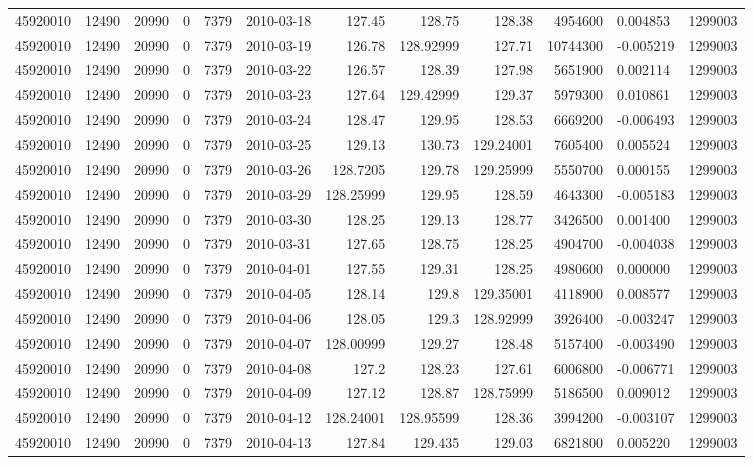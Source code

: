 \begin{tabular}{l | r | r | r | r | l | r | r | r | r | l | r}
45920010 & 12490 & 20990 & 0 & 7379 & 2010-03-18 & 127.45 & 128.75 & 128.38 & 4954600 & 0.004853 & 1299003 \\
45920010 & 12490 & 20990 & 0 & 7379 & 2010-03-19 & 126.78 & 128.92999 & 127.71 & 10744300 & -0.005219 & 1299003 \\
45920010 & 12490 & 20990 & 0 & 7379 & 2010-03-22 & 126.57 & 128.39 & 127.98 & 5651900 & 0.002114 & 1299003 \\
45920010 & 12490 & 20990 & 0 & 7379 & 2010-03-23 & 127.64 & 129.42999 & 129.37 & 5979300 & 0.010861 & 1299003 \\
45920010 & 12490 & 20990 & 0 & 7379 & 2010-03-24 & 128.47 & 129.95 & 128.53 & 6669200 & -0.006493 & 1299003 \\
45920010 & 12490 & 20990 & 0 & 7379 & 2010-03-25 & 129.13 & 130.73 & 129.24001 & 7605400 & 0.005524 & 1299003 \\
45920010 & 12490 & 20990 & 0 & 7379 & 2010-03-26 & 128.7205 & 129.78 & 129.25999 & 5550700 & 0.000155 & 1299003 \\
45920010 & 12490 & 20990 & 0 & 7379 & 2010-03-29 & 128.25999 & 129.95 & 128.59 & 4643300 & -0.005183 & 1299003 \\
45920010 & 12490 & 20990 & 0 & 7379 & 2010-03-30 & 128.25 & 129.13 & 128.77 & 3426500 & 0.001400 & 1299003 \\
45920010 & 12490 & 20990 & 0 & 7379 & 2010-03-31 & 127.65 & 128.75 & 128.25 & 4904700 & -0.004038 & 1299003 \\
45920010 & 12490 & 20990 & 0 & 7379 & 2010-04-01 & 127.55 & 129.31 & 128.25 & 4980600 & 0.000000 & 1299003 \\
45920010 & 12490 & 20990 & 0 & 7379 & 2010-04-05 & 128.14 & 129.8 & 129.35001 & 4118900 & 0.008577 & 1299003 \\
45920010 & 12490 & 20990 & 0 & 7379 & 2010-04-06 & 128.05 & 129.3 & 128.92999 & 3926400 & -0.003247 & 1299003 \\
45920010 & 12490 & 20990 & 0 & 7379 & 2010-04-07 & 128.00999 & 129.27 & 128.48 & 5157400 & -0.003490 & 1299003 \\
45920010 & 12490 & 20990 & 0 & 7379 & 2010-04-08 & 127.2 & 128.23 & 127.61 & 6006800 & -0.006771 & 1299003 \\
45920010 & 12490 & 20990 & 0 & 7379 & 2010-04-09 & 127.12 & 128.87 & 128.75999 & 5186500 & 0.009012 & 1299003 \\
45920010 & 12490 & 20990 & 0 & 7379 & 2010-04-12 & 128.24001 & 128.95599 & 128.36 & 3994200 & -0.003107 & 1299003 \\
45920010 & 12490 & 20990 & 0 & 7379 & 2010-04-13 & 127.84 & 129.435 & 129.03 & 6821800 & 0.005220 & 1299003 \\

\end{tabular}
